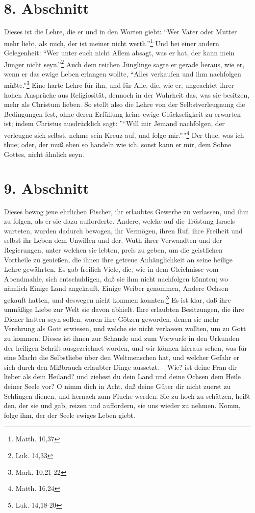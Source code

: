 \section{8. Abschnitt} \label{kap4_ab8}

Dieses ist die Lehre, die er und in den Worten giebt: "`Wer Vater oder Mutter
mehr liebt, als mich, der ist meiner nicht werth."'\footnote{Matth. 10,37} Und
bei einer andern Gelegenheit: "`Wer unter euch nicht Allem absagt, was er hat,
der kann mein Jünger nicht seyn."'\footnote{Luk. 14,33} Auch dem reichen
Jünglinge sagte er gerade heraus, wie er, wenn er das ewige Leben erlangen
wollte, "`Alles verkaufen und ihm nachfolgen müßte."'\footnote{Mark. 10,21-22}
Eine harte Lehre für ihn, und für Alle, die, wie er, ungeachtet ihrer hohen
Ansprüche aus Religiosität, dennoch in der Wahrheit das, was sie besitzen, mehr
als Christum lieben. So stellt also die Lehre von der Selbstverleugnung die
Bedingungen fest, ohne deren Erfüllung keine ewige Glückseligkeit zu erwarten
ist; indem Christus ausdrücklich sagt: ''"`Will mir Jemand nachfolgen, der
verleugne sich selbst, nehme sein Kreuz auf, und folge mir."'''\footnote{Matth.
16,24} Der thue, was ich thue; oder, der muß eben so handeln wie ich, sonst kann
er mir, dem Sohne Gottes, nicht ähnlich seyn.

\section{9. Abschnitt} \label{kap4_ab9}

Dieses bewog jene ehrlichen Fischer, ihr erlaubtes Gewerbe zu verlassen, und ihm
zu folgen, als er sie dazu aufforderte. Andere, welche auf die Tröstung Israels
warteten, wurden dadurch bewogen, ihr Vermögen, ihren Ruf, ihre Freiheit und
selbst ihr Leben dem Unwillen und der. Wuth ihrer Verwandten und der
Regierungen, unter welchen sie lebten, preis zu geben, um die geistlichen
Vortheile zu genießen, die ihnen ihre getreue Anhänglichkeit an seine heilige
Lehre gewährten. Es gab freilich Viele, die, wie in dem Gleichnisse vom
Abendmahle, sich entschuldigen, daß sie ihm nicht nachfolgen könnten; wo nämlich
Einige Land angekauft, Einige Weiber genommen, Andere Ochsen gekauft hatten, und
deswegen nicht kommen konnten.\footnote{Luk. 14,18-20} Es ist klar, daß ihre
unmäßige Liebe zur Welt sie davon abhielt. Ihre erlaubten Besitzungen, die ihre
Diener hatten seyn sollen, waren ihre Götzen geworden, denen sie mehr Verehrung
als Gott erwiesen, und welche sie nicht verlassen wollten, um zu Gott zu kommen.
Dieses ist ihnen zur Schande und zum Vorwurfe in den Urkunden der heiligen
Schrift ausgezeichnet worden, und wir können hieraus sehen, was für eine Macht
die Selbstliebe über den Weltmenschen hat, und welcher Gefahr er sich durch den
Mißbrauch erlaubter Dinge aussetzt. -- Wie? ist deine Fran dir lieber als dein
Heiland? und ziehest du dein Land und deine Ochsen dem Heile deiner Seele vor? O
nimm dich in Acht, daß deine Güter dir nicht zuerst zu Schlingen dienen, und
hernach zum Fluche werden. Sie zu hoch zu schätzen, heißt den, der sie und gab,
reizen und auffordern, sie uns wieder zu nehmen. Komm, folge ihm, der der Seele
ewiges Leben giebt.

